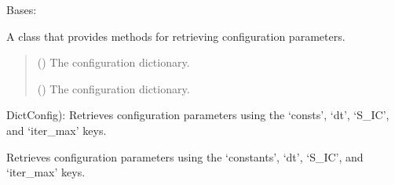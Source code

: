\documentclass[a4paper,11pt,english,openany]{sphinxmanual}
\begin{document}

\begin{fulllineitems}
\label{\detokenize{api/spyice.utils.config_sort:spyice.utils.config_sort.ConfigSort}}
\pysigstartsignatures
{}
\pysigstopsignatures
\sphinxAtStartPar
Bases: 

\sphinxAtStartPar
A class that provides methods for retrieving configuration parameters.
\begin{quote}\begin{description}
\sphinxAtStartPar
{} () \textendash{} The configuration dictionary.

\sphinxAtStartPar
{} () \textendash{} The configuration dictionary.

\end{description}\end{quote}


\begin{fulllineitems}

\pysigstartsignatures
{}
\pysigstopsignatures
\sphinxAtStartPar
DictConfig): Retrieves configuration parameters using the ‘consts’, ‘dt’, ‘S\_IC’, and ‘iter\_max’ keys.

\end{fulllineitems}


\begin{fulllineitems}
\label{\detokenize{api/spyice.utils.config_sort:spyice.utils.config_sort.ConfigSort.get_ownconfig_params}}
\pysigstartsignatures
{}
\pysigstopsignatures
\sphinxAtStartPar
Retrieves configuration parameters using the ‘constants’, ‘dt’, ‘S\_IC’, and ‘iter\_max’ keys.


\end{fulllineitems}
\end{fulllineitems}
\end{document}
